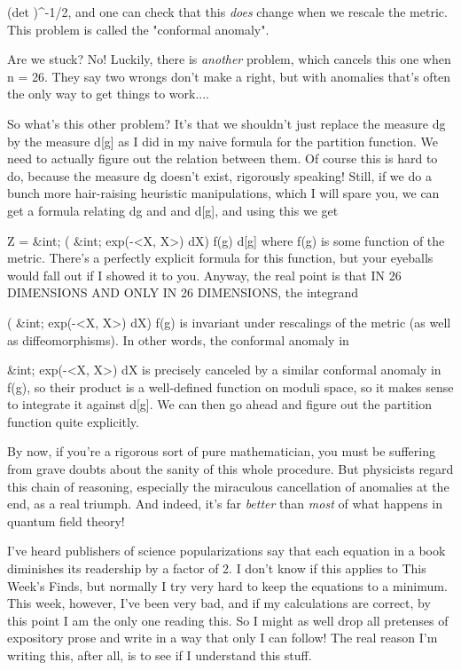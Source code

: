                   (det \Delta )^{-1/2},
and one can check that this \emph{does} change when we rescale the metric. 
This problem is called the "conformal anomaly".  

Are we stuck?  No!  Luckily, there is \emph{another} problem, which cancels
this one when n = 26.   They say two wrongs don't make a right, but 
with anomalies that's often the only way to get things to work....

So what's this other problem?  It's that we shouldn't just replace the
measure dg by the measure d[g] as I did in my naive formula for the
partition function.  We need to actually figure out the relation between
them.  Of course this is hard to do, because the measure dg doesn't
exist, rigorously speaking!  Still, if we do a bunch more hair-raising
heuristic manipulations, which I will spare you, we can get a formula
relating dg and and d[g], and using this we get
 
      Z = &int; ( &int; exp(-<X, \Delta X>) dX) f(g) d[g]   
where f(g) is some function of the metric.  There's a perfectly explicit
formula for this function, but your eyeballs would fall out if I showed
it to you.  Anyway, the real point is that IN 26 DIMENSIONS AND ONLY IN 26
DIMENSIONS, the integrand

               ( &int; exp(-<X, \Delta X>) dX) f(g) 
is invariant under rescalings of the metric (as well as diffeomorphisms).
In other words, the conformal anomaly in

                 &int; exp(-<X, \Delta X>) dX
is precisely canceled by a similar conformal anomaly in f(g), so their
product is a well-defined function on moduli space, so it makes sense
to integrate it against d[g].  We can then go ahead and figure out the
partition function quite explicitly.

By now, if you're a rigorous sort of pure mathematician, you must be
suffering from grave doubts about the sanity of this whole procedure.
But physicists regard this chain of reasoning, especially the miraculous
cancellation of anomalies at the end, as a real triumph.  And indeed,
it's far \emph{better} than \emph{most} 
of what happens in quantum field theory!

I've heard publishers of science popularizations say that each equation
in a book diminishes its readership by a factor of 2.  I don't know if
this applies to This Week's Finds, but normally I try very hard to keep
the equations to a minimum.  This week, however, I've been very bad, and
if my calculations are correct, by this point I am the only one reading
this.  So I might as well drop all pretenses of expository prose and
write in a way that only I can follow!  The real reason I'm writing
this, after all, is to see if I understand this stuff.

